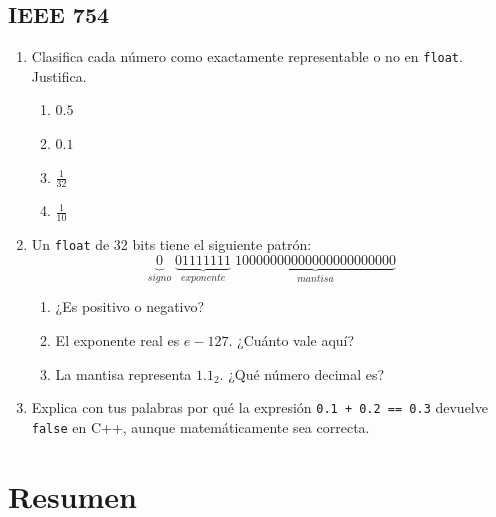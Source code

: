 \documentclass[12pt, oneside]{article}
\begin{document}
\subsection{IEEE 754}

\begin{enumerate}[resume]

  \item Clasifica cada número como exactamente representable o no en
        \texttt{float}. Justifica.
        \begin{enumerate}
          \item $0.5$
          \item $0.1$
          \item $\frac{1}{32}$
          \item $\frac{1}{10}$
        \end{enumerate}

  \item Un \texttt{float} de 32 bits tiene el siguiente patrón:
        \[
          \underbrace{0}_{signo}\;
          \underbrace{01111111}_{exponente}\;
          \underbrace{10000000000000000000000}_{mantisa}
        \]
        \begin{enumerate}
          \item ¿Es positivo o negativo?
          \item El exponente real es $e - 127$. ¿Cuánto vale aquí?
          \item La mantisa representa $1.1_2$. ¿Qué número decimal es?
        \end{enumerate}

  \item Explica con tus palabras por qué la expresión \texttt{0.1 + 0.2 == 0.3}
        devuelve \texttt{false} en C++, aunque matemáticamente sea correcta.

\end{enumerate}

\section{Resumen}
\end{document}
